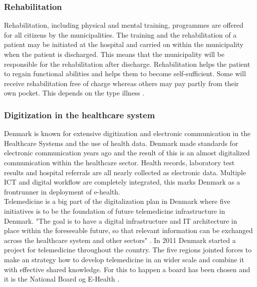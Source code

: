 \subsubsection{Rehabilitation}

Rehabilitation, including physical and mental training, programmes are offered for all citizens by the municipalities. The training and the rehabilitation of a patient may be initiated at the hospital and carried on within the municipality when the patient is discharged. This means that the municipality will be responsible for the rehabilitation after discharge. Rehabilitation helps the patient to regain functional abilities and helps them to become self-sufficient. Some will receive rehabilitation free of charge whereas others may pay partly from their own pocket. This depends on the type illness \cite{Healthcareindk2, retningsrehab, WHO}.



\subsubsection{Digitization in the healthcare system}

Denmark is known for extensive digitization and electronic communication in the Healthcare Systems and the use of health data. Denmark made standards for electronic communication years ago and the result of this is an almost digitalized communication within the healthcare sector. Health records, laboratory test results and hospital referrals are all nearly collected as electronic data. 
Multiple ICT and digital workflow are completely integrated, this marks Denmark as a frontrunner in deployment of e-health.\\
Telemedicine is a big part of the digitalization plan in Denmark where five initiatives is to be the foundation of future telemedicine infrastructure in Denmark. "The goal is to have a digital infrastructure and IT architecture in place within the foreseeable future, so that relevant information can be exchanged across the healthcare system and other sectors" \cite{Healthcareindk2}.
In 2011 Denmark started a project for telemedicine throughout the country. The five regions jointed forces to make an strategy how to develop telemedicine in an wider scale and combine it with effective shared knowledge. For this to happen a board has been chosen and it is the National Board og E-Health \cite{DKhealthreview}. %



